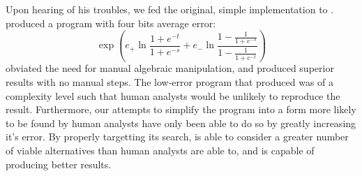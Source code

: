 \documentclass[paper.tex]{subfiles}
\begin{document}
Upon hearing of his troubles,
  we fed the original, simple implementation to \casio.
\casio produced a program with four bits average error:
  \begin{equation*}
  \operatorname{exp}\left(e_+\ln{\frac{1+e^{-t}}{1+e^{-s}}} +
     e_-\ln{\frac{1-\frac{1}{1+e^{-s}}}
                 {1-\frac{1}{1+e^{-t}}}}\right)
  \end{equation*}
\casio obviated the need for manual algebraic manipulation,
  and produced superior results with no manual steps.
The low-error program that \casio produced was of a complexity level
  such that human analysts would be unlikely to reproduce the result. 
Furthermore, our attempts to simplify the program
  into a form more likely to be found by human analysts
  have only been able to do so by greatly increasing it's error.
By properly targetting its search,
  \casio is able to consider a greater number of viable alternatives
  than human analysts are able to,
  and is capable of producing better results.
\end{document}
